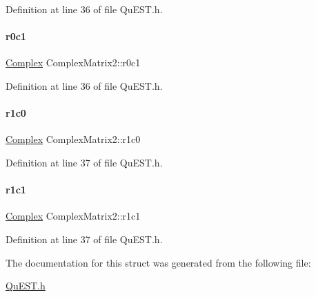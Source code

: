 Definition at line 36 of file Qu\+E\+S\+T.\+h.

\mbox{\label{structComplexMatrix2_a0f3932f055a8b05cef361bce25d51172}} 
\paragraph{\texorpdfstring{r0c1}{r0c1}}
{\footnotesize\ttfamily \mbox{\hyperlink{structComplex}{Complex}} Complex\+Matrix2\+::r0c1}



Definition at line 36 of file Qu\+E\+S\+T.\+h.

\mbox{\label{structComplexMatrix2_ab98282015ed2065e53fbc9638e2583ab}} 
\paragraph{\texorpdfstring{r1c0}{r1c0}}
{\footnotesize\ttfamily \mbox{\hyperlink{structComplex}{Complex}} Complex\+Matrix2\+::r1c0}



Definition at line 37 of file Qu\+E\+S\+T.\+h.

\mbox{\label{structComplexMatrix2_a763007c3070802373549ba0350f83c8a}} 
\paragraph{\texorpdfstring{r1c1}{r1c1}}
{\footnotesize\ttfamily \mbox{\hyperlink{structComplex}{Complex}} Complex\+Matrix2\+::r1c1}



Definition at line 37 of file Qu\+E\+S\+T.\+h.



The documentation for this struct was generated from the following file\+:\begin{DoxyCompactItemize}
\item 
\mbox{\hyperlink{QuEST_8h}{Qu\+E\+S\+T.\+h}}\end{DoxyCompactItemize}
